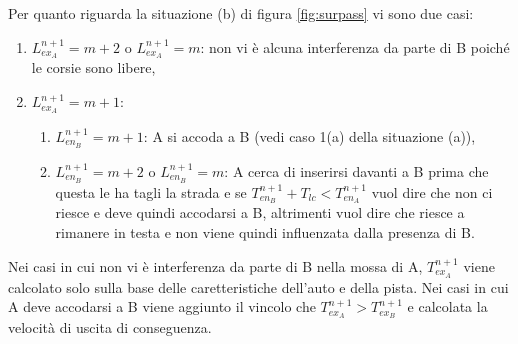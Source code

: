 \documentclass[11pt,a4paper]{report}
\begin{document}
Per quanto riguarda la situazione (b) di figura \ref{fig:surpass} vi sono due casi:
\begin{enumerate}
\item $L_{ex_A}^{n+1} = m+2$ o $L_{ex_A}^{n+1} = m$: non vi è alcuna interferenza da parte di B poiché le corsie sono libere,
\item $L_{ex_A}^{n+1} = m+1$:
  \begin{enumerate}
  \item $L_{en_B}^{n+1} = m+1$: A si accoda a B (vedi caso 1(a) della situazione (a)),
  \item $L_{en_B}^{n+1} = m+2$ o $L_{en_B}^{n+1} = m$: A cerca di inserirsi davanti a B prima che questa le ha tagli la strada e se $T_{en_B}^{n+1} + T_{lc} < T_{en_A}^{n+1}$ vuol dire che non ci riesce e deve quindi accodarsi a B, altrimenti vuol dire che riesce a rimanere in testa e non viene quindi influenzata dalla presenza di B.
  \end{enumerate}
\end{enumerate}

Nei casi in cui non vi è interferenza da parte di B nella mossa di A, $T_{ex_A}^{n+1}$ viene calcolato solo sulla base delle caretteristiche dell'auto e della pista.
Nei casi in cui A deve accodarsi a B viene aggiunto il vincolo che $T_{ex_A}^{n+1} > T_{ex_B}^{n+1}$ e calcolata la velocità di uscita di conseguenza.
\end{document}
